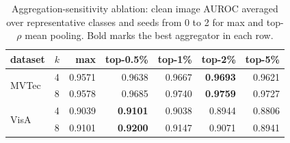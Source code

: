 \begin{table}[pos=t]
\centering
\caption{Aggregation-sensitivity ablation: clean image AUROC averaged over representative classes and seeds from 0 to 2 for max and top-$\rho$ mean pooling. Bold marks the best aggregator in each row.}
\label{tab:agg-ablation}
\footnotesize
\setlength{\tabcolsep}{4pt}
\begin{tabular}{llrrrrr}
\toprule
dataset & $k$ & max & top-0.5\% & top-1\% & top-2\% & top-5\% \\
\midrule
\multirow{2}{*}{MVTec} & 4 & 0.9571 & 0.9638 & 0.9667 & \textbf{0.9693} & 0.9621 \\
 & 8 & 0.9578 & 0.9685 & 0.9740 & \textbf{0.9759} & 0.9727 \\
\midrule
\multirow{2}{*}{VisA} & 4 & 0.9039 & \textbf{0.9101} & 0.9038 & 0.8944 & 0.8806 \\
 & 8 & 0.9101 & \textbf{0.9200} & 0.9147 & 0.9071 & 0.8941 \\
\bottomrule
\end{tabular}
\end{table}
